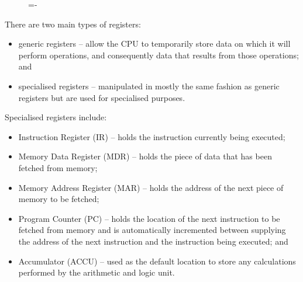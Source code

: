 \documentclass[a4paper]{systems-software}
\begin{document}
\begin{figure}[H]
  \lineskip=-\fboxrule
\end{figure}

There are two main types of registers:
\begin{itemize}
	\item generic registers -- allow the CPU to temporarily store data on which it will perform operations, and consequently data that results from those operations; and
	\item specialised registers -- manipulated in mostly the same fashion as generic registers but are used for specialised purposes.
\end{itemize}

Specialised registers include:
\begin{itemize}
	\item Instruction Register (IR) -- holds the instruction currently being executed;
	\item Memory Data Register (MDR) -- holds the piece of data that has been fetched from memory;
	\item Memory Address Register (MAR) -- holds the address of the next piece of memory to be fetched;
	\item Program Counter (PC) -- holds the location of the next instruction to be fetched from memory and is automatically incremented between supplying the address of the next instruction and the instruction being executed; and
	\item Accumulator (ACCU) -- used as the default location to store any calculations performed by the arithmetic and logic unit.
\end{itemize}
\end{document}

